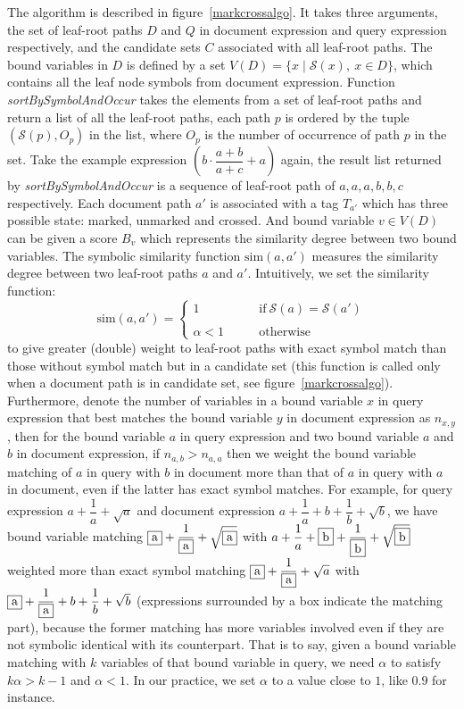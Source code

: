 The algorithm is described in figure~\ref{markcrossalgo}. It takes three arguments, the set of leaf-root paths $D$ and $Q$ in document expression and query expression respectively, and the candidate sets $C$ associated with all leaf-root paths. 
The bound variables in $D$ is defined by a set $V(D) = \{x \mid \mathcal{S}(x),\ x \in D\}$, which contains all the leaf node symbols from document expression.
Function \textit{sortBySymbolAndOccur} takes the elements from a set of leaf-root paths and return a list of all the leaf-root paths, each path $p$ is ordered by the tuple $(\mathcal{S}(p), O_p)$ in the list, where $O_p$ is the number of occurrence of path $p$ in the set. 
Take the example expression $\left(b \cdot \dfrac{a+b}{a+c} + a\right)$ again, the result list returned by \textit{sortBySymbolAndOccur} is a sequence of leaf-root path of $a,a,a,b,b,c$ respectively.
Each document path $a'$ is associated with a tag $T_{a'}$ which has three possible state: marked, unmarked and crossed. And bound variable $v \in V(D)$ can be given a score $B_v$ which represents the similarity degree between two bound variables. 
The symbolic similarity function $\mathrm{sim}(a,a')$ measures the similarity degree between two leaf-root paths $a$ and $a'$. 
Intuitively, we set the similarity function:
$$
\mathrm{sim}(a,a') = 
\left\{
\begin{array}{ll}
1    &\qquad \mathrm{if}\  \mathcal{S}(a) = \mathcal{S}(a')
\\
\\
\alpha < 1  &\qquad \mathrm{otherwise}
\end{array}
\right.
$$
to give greater (double) weight to leaf-root paths with exact symbol match than those without symbol match but in a candidate set
(this function is called only when a document path is in candidate set, see figure~\ref{markcrossalgo}).
Furthermore, denote the number of variables in a bound variable $x$ in query expression that best matches the bound variable $y$ in document expression as $n_{x,y}$, 
then for the bound variable $a$ in query expression and two bound variable $a$ and $b$ in document expression, if $n_{a,b} > n_{a,a}$ then we weight the bound variable matching of $a$ in query with $b$ in document more than that of $a$ in query with $a$ in document, even if the latter has exact symbol matches.
For example, for query expression $a+\dfrac 1 a + \sqrt{a}$ and document expression $a+\dfrac 1 a + b + \dfrac 1 b + \sqrt{b}$, we have bound variable matching $\fbox{a}+\dfrac 1 {\fbox{a}} + \sqrt{\fbox{a}}$ with $a+\dfrac 1 a + \fbox{b} + \dfrac 1 {\fbox{b}} + \sqrt{\fbox{b}}$ weighted more than exact symbol matching $\fbox{a}+\dfrac 1 {\fbox{a}} + \sqrt{a}$ with $\fbox{a}+\dfrac 1 {\fbox{a}} + b + \dfrac 1 b + \sqrt{b}$
(expressions surrounded by a box indicate the matching part),
because the former matching has more variables involved even if they are not symbolic identical with its counterpart. 
That is to say, given a bound variable matching with $k$ variables of that bound variable in query, we need $\alpha$ to satisfy $ k \alpha > k-1 $
and $\alpha < 1$. In our practice, we set $\alpha$ to a value close to $1$, like $0.9$ for instance.

